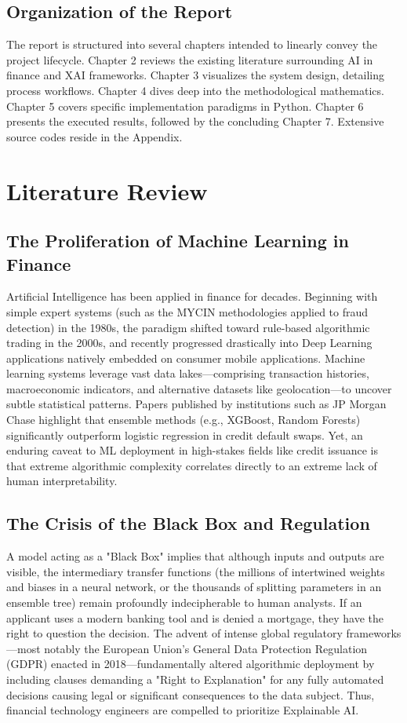 \documentclass[12pt,a4paper]{report}
\begin{document}
\section{Organization of the Report}
The report is structured into several chapters intended to linearly convey the project lifecycle. Chapter 2 reviews the existing literature surrounding AI in finance and XAI frameworks. Chapter 3 visualizes the system design, detailing process workflows. Chapter 4 dives deep into the methodological mathematics. Chapter 5 covers specific implementation paradigms in Python. Chapter 6 presents the executed results, followed by the concluding Chapter 7. Extensive source codes reside in the Appendix.

\chapter{Literature Review}

\section{The Proliferation of Machine Learning in Finance}
Artificial Intelligence has been applied in finance for decades. Beginning with simple expert systems (such as the MYCIN methodologies applied to fraud detection) in the 1980s, the paradigm shifted toward rule-based algorithmic trading in the 2000s, and recently progressed drastically into Deep Learning applications natively embedded on consumer mobile applications. 
Machine learning systems leverage vast data lakes---comprising transaction histories, macroeconomic indicators, and alternative datasets like geolocation---to uncover subtle statistical patterns. Papers published by institutions such as JP Morgan Chase highlight that ensemble methods (e.g., XGBoost, Random Forests) significantly outperform logistic regression in credit default swaps. Yet, an enduring caveat to ML deployment in high-stakes fields like credit issuance is that extreme algorithmic complexity correlates directly to an extreme lack of human interpretability.

\section{The Crisis of the Black Box and Regulation}
A model acting as a "Black Box" implies that although inputs and outputs are visible, the intermediary transfer functions (the millions of intertwined weights and biases in a neural network, or the thousands of splitting parameters in an ensemble tree) remain profoundly indecipherable to human analysts. 
If an applicant uses a modern banking tool and is denied a mortgage, they have the right to question the decision. The advent of intense global regulatory frameworks---most notably the European Union's General Data Protection Regulation (GDPR) enacted in 2018---fundamentally altered algorithmic deployment by including clauses demanding a "Right to Explanation" for any fully automated decisions causing legal or significant consequences to the data subject. Thus, financial technology engineers are compelled to prioritize Explainable AI.
\end{document}

